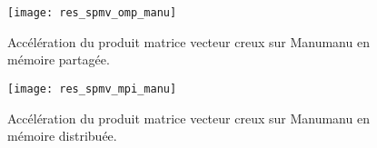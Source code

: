\begin{figure}[t!]
  \centering
  \texttt{[image: res\_spmv\_omp\_manu]}
  \caption{Accélération du produit matrice vecteur creux sur Manumanu en mémoire partagée.}
  \label{fig:res_spmv_omp_manumanu}
\end{figure}

\begin{figure}[t!]
  \centering
  \texttt{[image: res\_spmv\_mpi\_manu]}
  \caption{Accélération du produit matrice vecteur creux sur Manumanu en mémoire distribuée.}
  \label{fig:res_spmv_mpi_manumanu}
\end{figure}
